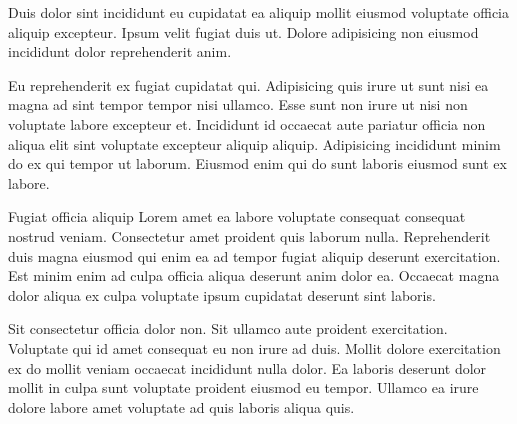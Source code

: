 \wrtxPortfolioChapter{\TEXTacknowledgements}



Duis dolor sint incididunt eu cupidatat ea aliquip mollit eiusmod voluptate officia aliquip excepteur. Ipsum velit fugiat duis ut. Dolore adipisicing non eiusmod incididunt dolor reprehenderit anim.

Eu reprehenderit ex fugiat cupidatat qui. Adipisicing quis irure ut sunt nisi ea magna ad sint tempor tempor nisi ullamco. Esse sunt non irure ut nisi non voluptate labore excepteur et. Incididunt id occaecat aute pariatur officia non aliqua elit sint voluptate excepteur aliquip aliquip. Adipisicing incididunt minim do ex qui tempor ut laborum. Eiusmod enim qui do sunt laboris eiusmod sunt ex labore.

Fugiat officia aliquip Lorem amet ea labore voluptate consequat consequat nostrud veniam. Consectetur amet proident quis laborum nulla. Reprehenderit duis magna eiusmod qui enim ea ad tempor fugiat aliquip deserunt exercitation. Est minim enim ad culpa officia aliqua deserunt anim dolor ea. Occaecat magna dolor aliqua ex culpa voluptate ipsum cupidatat deserunt sint laboris.

Sit consectetur officia dolor non. Sit ullamco aute proident exercitation. Voluptate qui id amet consequat eu non irure ad duis. Mollit dolore exercitation ex do mollit veniam occaecat incididunt nulla dolor. Ea laboris deserunt dolor mollit in culpa sunt voluptate proident eiusmod eu tempor. Ullamco ea irure dolore labore amet voluptate ad quis laboris aliqua quis.
